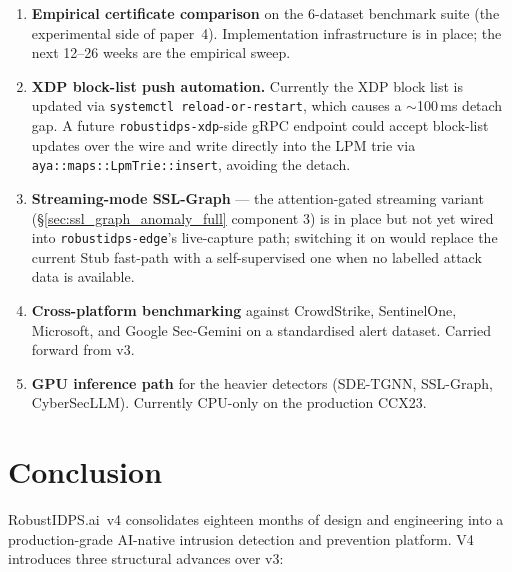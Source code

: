 \documentclass[11pt,a4paper]{article}
\begin{document}
\begin{enumerate}
  \item \textbf{Empirical certificate comparison} on the 6-dataset
        benchmark suite (the experimental side of paper~4).
        Implementation infrastructure is in place; the next 12--26
        weeks are the empirical sweep.
  \item \textbf{XDP block-list push automation.}  Currently the XDP
        block list is updated via
        \texttt{systemctl reload-or-restart}, which causes a
        $\sim$100\,ms detach gap.  A future
        \texttt{robustidps-xdp}-side gRPC endpoint could accept block-list
        updates over the wire and write directly into the LPM trie
        via \texttt{aya::maps::LpmTrie::insert}, avoiding the
        detach.
  \item \textbf{Streaming-mode SSL-Graph} --- the attention-gated
        streaming variant
        (\S\ref{sec:ssl_graph_anomaly_full} component 3) is in place
        but not yet wired into \texttt{robustidps-edge}'s live-capture
        path; switching it on would replace the current Stub fast-path
        with a self-supervised one when no labelled attack data is
        available.
  \item \textbf{Cross-platform benchmarking} against CrowdStrike,
        SentinelOne, Microsoft, and Google Sec-Gemini on a
        standardised alert dataset.  Carried forward from v3.
  \item \textbf{GPU inference path} for the heavier detectors
        (SDE-TGNN, SSL-Graph, CyberSecLLM).  Currently CPU-only
        on the production CCX23.
\end{enumerate}

\section{Conclusion}
\label{sec:conclusion}

RobustIDPS.ai~v4 consolidates eighteen months of design and engineering
into a production-grade AI-native intrusion detection and prevention
platform.  V4 introduces three structural advances over v3:
\end{document}
